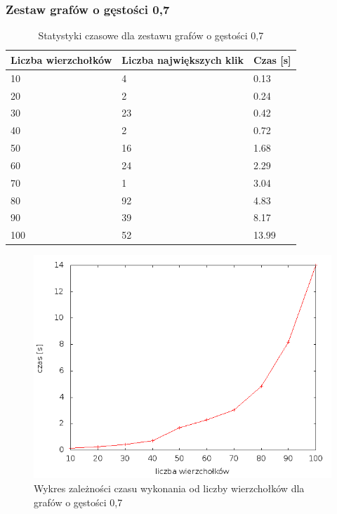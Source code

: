 \documentclass[12pt, a4paper]{article}
\begin{document}
\subsubsection*{Zestaw grafów o gęstości 0,7}
\begin{table}[H]
\caption{Statystyki czasowe dla zestawu grafów o gęstości 0,7}
\begin{center}
    \begin{tabular}{|l|l|l|}
    \hline
    Liczba wierzchołków & Liczba największych klik & Czas [s] \\ \hline
    10 & 4 & 0.13 \\ \hline
    20 & 2 & 0.24 \\ \hline
    30 & 23 & 0.42 \\ \hline
    40 & 2 & 0.72 \\ \hline
    50 & 16 & 1.68 \\ \hline
    60 & 24 & 2.29 \\ \hline
    70 & 1 & 3.04 \\ \hline
    80 & 92 & 4.83 \\ \hline
    90 & 39 & 8.17 \\ \hline
    100 & 52 & 13.99 \\ \hline
    \end{tabular}
\end{center}
\end{table}

\begin{figure}[h]
    \begin{center}
	\includegraphics[scale=0.5]{results/img/den/den_07.png}
	\caption{Wykres zależności czasu wykonania od liczby wierzchołków dla grafów o gęstości 0,7}
    \end{center}
\end{figure}
\end{document}
